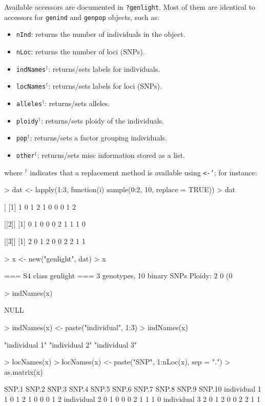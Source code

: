 \documentclass{article}
\newcommand{\code}[1]{{{\tt #1}}}
\begin{document}
Available accessors are documented in \code{?genlight}.
Most of them are identical to accessors for \texttt{genind} and \texttt{genpop} objects, such as:
\begin{itemize}
  \item \texttt{nInd}: returns the number of individuals in the object.
  \item \texttt{nLoc}: returns the number of loci (SNPs).
  \item \texttt{indNames}$^{\dagger}$: returns/sets labels for individuals.
  \item \texttt{locNames}$^{\dagger}$: returns/sets labels for loci (SNPs).
  \item \texttt{alleles}$^{\dagger}$: returns/sets alleles.
  \item \texttt{ploidy}$^{\dagger}$: returns/sets ploidy of the individuals.
  \item \texttt{pop}$^{\dagger}$: returns/sets a factor grouping individuals.
  \item \texttt{other}$^{\dagger}$: returns/sets misc information stored as a list.
\end{itemize}
where $^{\dagger}$ indicates that a replacement method is available using \texttt{<-'}; for instance:
\begin{Schunk}
\begin{Sinput}
> dat <- lapply(1:3, function(i) sample(0:2, 10, replace = TRUE))
> dat
\end{Sinput}
\begin{Soutput}
[[1]]
 [1] 1 0 1 2 1 0 0 0 1 2

[[2]]
 [1] 0 1 0 0 0 2 1 1 1 0

[[3]]
 [1] 2 0 1 2 0 0 2 2 1 1
\end{Soutput}
\begin{Sinput}
> x <- new("genlight", dat)
> x
\end{Sinput}
\begin{Soutput}
 === S4 class genlight ===
 3 genotypes,  10 binary SNPs
 Ploidy: 2
 0 (0 %
\end{Soutput}
\begin{Sinput}
> indNames(x)
\end{Sinput}
\begin{Soutput}
NULL
\end{Soutput}
\begin{Sinput}
> indNames(x) <- paste("individual", 1:3)
> indNames(x)
\end{Sinput}
\begin{Soutput}
[1] "individual 1" "individual 2" "individual 3"
\end{Soutput}
\begin{Sinput}
> locNames(x)
> locNames(x) <- paste("SNP", 1:nLoc(x), sep = ".")
> as.matrix(x)
\end{Sinput}
\begin{Soutput}
             SNP.1 SNP.2 SNP.3 SNP.4 SNP.5 SNP.6 SNP.7 SNP.8 SNP.9 SNP.10
individual 1     1     0     1     2     1     0     0     0     1      2
individual 2     0     1     0     0     0     2     1     1     1      0
individual 3     2     0     1     2     0     0     2     2     1      1
\end{Soutput}
\end{Schunk}
\end{document}
